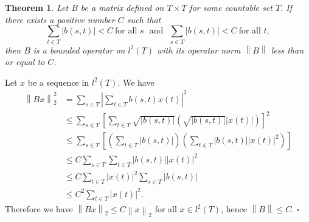 \documentclass[12pt]{article}
\newtheorem{thm}{Theorem}[section]
\newcommand{\norm}[1]{\left\|#1\right\|}
\newcommand{\normt}[1]{\norm{#1}_2}
\newenvironment{proof}{\begin{trivlist}\item[\hskip%
\labelsep{\bf Proof.}]}%
{\hfill$\square$\rm\end{trivlist}}
\begin{document}
\begin{thm} 
    Let $B$ be a matrix defined on $T\times T$ for some countable set $T$.  If there exists a positive number $C$ such that
    $$
        \sum_{t\in T}|b(s,t)|<C \ \text{for all\ }s\ \ \ \text{and} \ \ \  \sum_{s\in T}|b(s,t)|<C \  \text{for all\ } t,
    $$
    then $B$ is a bounded operator on $l^2(T)$ with its operator  norm $\norm{B}$ less than or equal to $C$.
\end{thm}
    \begin{proof}
        Let $x$ be a sequence in $l^2(T)$.  We have
        \begin{align*}
            \norm{Bx}_2^2 & = \sum_{s\in T}\left|\sum_{t\in T}b(s,t)x(t)\right|^2\\
            &\leq
            \sum_{s\in T}\left[\sum_{t\in T}\sqrt{|b(s,t)|}\left(\sqrt{|b(s,t)|}|x(t)|\right)\right]^2\\
            &\leq
            \sum_{s\in T}\left[\left(\sum_{t\in T}|b(s,t)|\right)\left(\sum_{t\in T}|b(s,t)||x(t)|^2\right)\right]\\
            &\leq
            C\sum_{s\in T}\sum_{t\in T}|b(s,t)||x(t)|^2\\
            &\leq
            C\sum_{t\in T}|x(t)|^2\sum_{s\in T}|b(s,t)|\\
            &\leq
            C^2\sum_{t\in T}|x(t)|^2.
        \end{align*}
    Therefore we have $\normt{Bx}\leq C\normt{x}$ for all $x \in l^2(T)$, hence $\norm{B}\leq C$.
    \end{proof}
\end{document}
